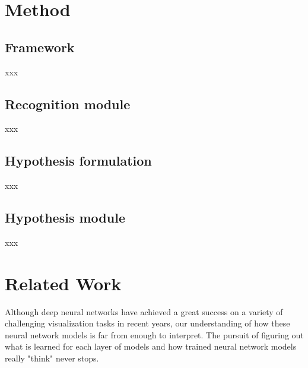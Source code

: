 \documentclass[10pt,twocolumn,letterpaper]{article}
\begin{document}
\section{Method}

\subsection{Framework}
xxx

\subsection{Recognition module}
xxx

\subsection{Hypothesis formulation}
xxx

\subsection{Hypothesis module}
xxx

\section{Related Work}
Although deep neural networks have achieved a great success on a variety of challenging visualization tasks in recent years, our understanding of how these neural network models is far from enough to interpret.
The pursuit of figuring out what is learned for each layer of models and how trained neural network models really "think" never stops.
\end{document}

